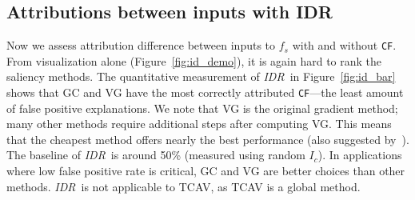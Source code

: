 \documentclass[twoside]{article}
\newcommand{\CF}{\texttt{CF}}
\newcommand{\IDR}{\textit{IDR}}
\begin{document}
\subsection{Attributions between inputs with IDR}
Now we assess attribution difference between inputs to $f_s$ with and without \CF. From visualization alone (Figure~\ref{fig:id_demo}), it is again hard to rank the saliency methods. The quantitative measurement of \IDR~in Figure~\ref{fig:id_bar} shows that GC and VG have the most correctly attributed \CF---the least amount of false positive explanations. We note that VG is the original gradient method; many other methods require additional steps after computing VG. This means that the cheapest method offers nearly the best performance (also suggested by~\citet{Adebayo18}). The baseline of \IDR~is around 50\% (measured using random $I_c$). In applications where low false positive rate is critical, GC and VG are better choices than other methods. \IDR~is not applicable to TCAV, as TCAV is a global method.
\end{document}
